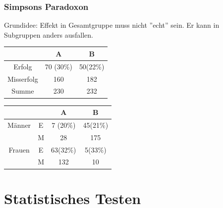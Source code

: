 \documentclass[10pt]{report}
\theoremstyle{definition}
\begin{document}
\subsection{Simpsons Paradoxon}
Grundidee: Effekt in Gesamtgruppe muss nicht ''echt'' sein. Er kann in Subgruppen anders ausfallen.

\begin{tabular}{|c|c|c|}
	\hline 
	& A & B \\ 
	\hline 
	Erfolg & 70 (30\%) &  50(22\%) \\ 
	\hline 
	Misserfolg & 160 & 182 \\ 
	\hline 
	Summe & 230 & 232 \\ 
	\hline 
\end{tabular} 

\begin{tabular}{|c|c|c|c|}
	\hline 
	&   & A & B \\ 
	\hline 
	Männer & E & 7 (20\%) & 45(21\%) \\ 
	\hline 
	& M & 28 & 175 \\ 
	\hline 
	Frauen & E & 63(32\%) & 5(33\%) \\ 
	\hline 
	& M  & 132 & 10 \\ 
	\hline 
\end{tabular} 

\chapter{Statistisches Testen}
\end{document}
